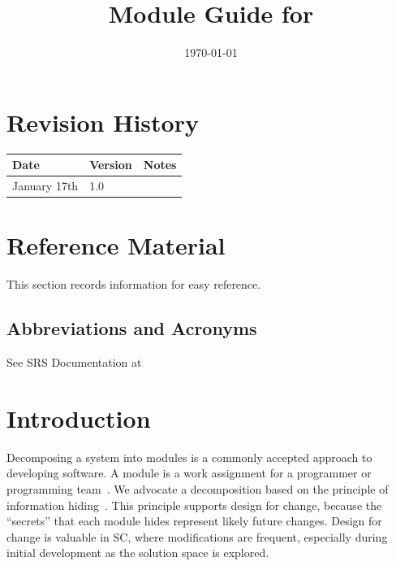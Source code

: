 \documentclass[12pt, titlepage]{article}
\begin{document}
\title{Module Guide for \progname{}} 
\author{\authname}
\date{\today}

\maketitle


\section{Revision History}

\begin{tabularx}{\textwidth}{p{3cm}p{2cm}X}
\toprule {\bf Date} & {\bf Version} & {\bf Notes}\\
\midrule
January 17th & 1.0 & \\
\bottomrule
\end{tabularx}

\newpage

\section{Reference Material}

This section records information for easy reference.

\subsection{Abbreviations and Acronyms}

See SRS Documentation at 

\newpage

\tableofcontents

\listoftables

\listoffigures

\newpage


\section{Introduction}

Decomposing a system into modules is a commonly accepted approach to developing
software.  A module is a work assignment for a programmer or programming
team~\citep{ParnasEtAl1984}.  We advocate a decomposition
based on the principle of information hiding~\citep{Parnas1972a}.  This
principle supports design for change, because the ``secrets'' that each module
hides represent likely future changes.  Design for change is valuable in SC,
where modifications are frequent, especially during initial development as the
solution space is explored.  
\end{document}
